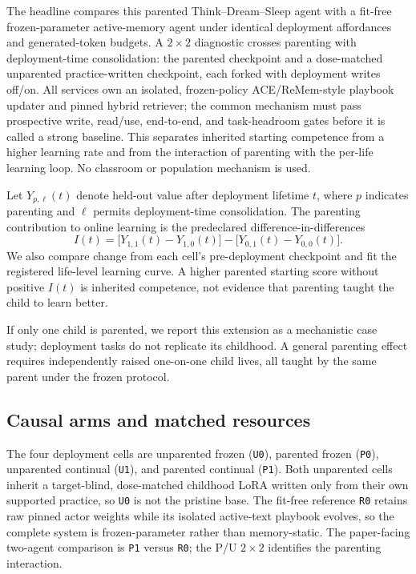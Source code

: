 \documentclass{article}
\begin{document}
The headline compares this parented Think--Dream--Sleep agent with a fit-free
frozen-parameter active-memory agent under identical deployment affordances and generated-token budgets. A
$2\times2$ diagnostic crosses parenting with deployment-time consolidation:
the parented checkpoint and a dose-matched unparented practice-written
checkpoint, each forked with deployment writes off/on. All services own an
isolated, frozen-policy ACE/ReMem-style playbook updater and pinned hybrid
retriever; the common mechanism must pass prospective write, read/use,
end-to-end, and task-headroom gates before it is called a strong baseline.
This separates inherited starting competence from a higher learning rate and
from the interaction of parenting with the per-life learning loop. No
classroom or population mechanism is used.

Let $Y_{p,\ell}(t)$ denote held-out value after deployment lifetime $t$, where
$p$ indicates parenting and $\ell$ permits deployment-time consolidation. The
parenting contribution to online learning is the predeclared
difference-in-differences
\[
  I(t)=\bigl[Y_{1,1}(t)-Y_{1,0}(t)\bigr]
       -\bigl[Y_{0,1}(t)-Y_{0,0}(t)\bigr].
\]
We also compare change from each cell's pre-deployment checkpoint and fit the
registered life-level learning curve. A higher parented starting score without
positive $I(t)$ is inherited competence, not evidence that parenting taught
the child to learn better.

If only one child is parented, we report this extension as a mechanistic case
study; deployment tasks do not replicate its childhood. A general parenting
effect requires independently raised one-on-one child lives, all taught by the
same parent under the frozen protocol.

\subsection{Causal arms and matched resources}

The four deployment cells are unparented frozen (\texttt{U0}), parented frozen
(\texttt{P0}), unparented continual (\texttt{U1}), and parented continual
(\texttt{P1}). Both unparented cells inherit a target-blind, dose-matched
childhood LoRA written only from their own supported practice, so \texttt{U0}
is not the pristine base. The fit-free reference \texttt{R0} retains raw
pinned actor weights while its isolated active-text playbook evolves, so the
complete system is frozen-parameter rather than memory-static.
The paper-facing two-agent comparison is \texttt{P1} versus \texttt{R0}; the
P/U $2\times2$ identifies the parenting interaction.
\end{document}
